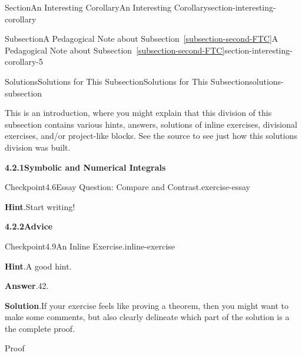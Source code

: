 \documentclass[twoside,10pt,]{article}
\newcommand{\blocktitlefont}{\relax}
\newcommand{\xreffont}{\relax}
\numberwithin{equation}{section}
\begin{document}
\begin{sectionptx}{Section}{An Interesting Corollary}{}{An Interesting Corollary}{}{}{section-interesting-corollary}
\begin{subsectionptx}{Subsection}{A Pedagogical Note about Subsection~{\xreffont\ref*{subsection-second-FTC}}}{}{A Pedagogical Note about Subsection~{\xreffont\ref*{subsection-second-FTC}}}{}{}{section-interesting-corollary-5}
\typeout{************************************************}
%
\begin{solutions-subsubsection}{Solutions}{Solutions for This Subsection}{}{Solutions for This Subsection}{}{}{solutions-subsection}
%
\begin{introduction}{}%
This is an introduction, where you might explain that this division of this subsection contains various hints, answers, solutions of inline exercises, divisional exercises, and\slash{}or project-like blocks.  See the source to see just how this solutions division was built.%
\end{introduction}%
\par\medskip
\noindent\textbf{\normalsize{}4.2.1\space\textperiodcentered\space{}Symbolic and Numerical Integrals}
\begin{inlinesolution}{Checkpoint}{4.6}{Essay Question: Compare and Contrast.}{exercise-essay}%
\par\smallskip%
\noindent\textbf{\blocktitlefont Hint}.\hypertarget{exercise-essay-3-main}{}\quad{}Start writing!%
\end{inlinesolution}%
\par\medskip
\noindent\textbf{\normalsize{}4.2.2\space\textperiodcentered\space{}Advice}
\begin{inlinesolution}{Checkpoint}{4.9}{An Inline Exercise.}{inline-exercise}%
\par\smallskip%
\noindent\textbf{\blocktitlefont Hint}.\hypertarget{inline-exercise-3-main}{}\quad{}A good hint.%
\par\smallskip%
\noindent\textbf{\blocktitlefont Answer}.\hypertarget{inline-exercise-4-main}{}\quad{}42.%
\par\smallskip%
\noindent\textbf{\blocktitlefont Solution}.\hypertarget{inline-exercise-5-main}{}\quad{}If your exercise feels like proving a theorem, then you might want to make some comments, but also clearly delineate which part of the solution is a the complete proof.%
\begin{solutionproof}{Proof}

\end{solutionproof}
\end{inlinesolution}
\end{solutions-subsubsection}
\end{subsectionptx}
\end{sectionptx}
\end{document}
